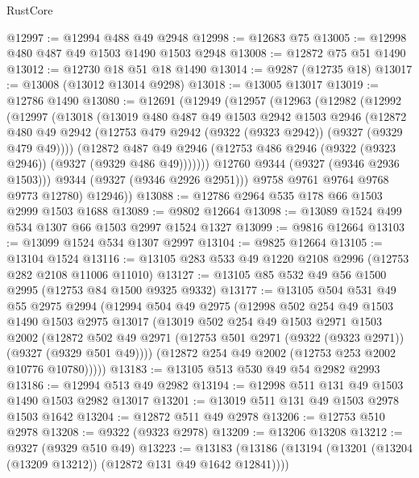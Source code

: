 \begin{lexlean}{RustCore}
\begin{coremodule}
@12997 := @12994 @488 @49 @2948
@12998 := @12683 @75
@13005 := @12998 @480 @487 @49 @1503 @1490 @1503 @2948
@13008 := @12872 @75 @51 @1490
@13012 := @12730 @18 @51 @18 @1490
@13014 := @9287 (@12735 @18)
@13017 := @13008 (@13012 @13014 @9298)
@13018 := @13005 @13017
@13019 := @12786 @1490
@13080 := @12691
    (@12949
      (@12957
        (@12963
          (@12982
            (@12992
              (@12997
                (@13018
                  (@13019
                    @480
                    @487
                    @49
                    @1503
                    @2942
                    @1503
                    @2946
                    (@12872
                      @480
                      @49
                      @2942
                      (@12753 @479 @2942 (@9322 (@9323 @2942)) (@9327 (@9329 @479 @49))))
                    (@12872
                      @487
                      @49
                      @2946
                      (@12753 @486 @2946 (@9322 (@9323 @2946)) (@9327 (@9329 @486 @49)))))))
              @12760
              @9344
              (@9327 (@9346 @2936 @1503)))
            @9344
            (@9327 (@9346 @2926 @2951)))
          @9758
          @9761
          @9764
          @9768
          @9773
          @12780)
        @12946))
@13088 := @12786 @2964 @535 @178 @66 @1503 @2999 @1503 @1688
@13089 := @9802 @12664
@13098 := @13089 @1524 @499 @534 @1307 @66 @1503 @2997 @1524 @1327
@13099 := @9816 @12664
@13103 := @13099 @1524 @534 @1307 @2997
@13104 := @9825 @12664
@13105 := @13104 @1524
@13116 := @13105 @283 @533 @49 @1220 @2108 @2996 (@12753 @282 @2108 @11006 @11010)
@13127 := @13105 @85 @532 @49 @56 @1500 @2995 (@12753 @84 @1500 @9325 @9332)
@13177 := @13105
    @504
    @531
    @49
    @55
    @2975
    @2994
    (@12994
      @504
      @49
      @2975
      (@12998
        @502
        @254
        @49
        @1503
        @1490
        @1503
        @2975
        @13017
        (@13019
          @502
          @254
          @49
          @1503
          @2971
          @1503
          @2002
          (@12872 @502 @49 @2971 (@12753 @501 @2971 (@9322 (@9323 @2971)) (@9327 (@9329 @501 @49))))
          (@12872 @254 @49 @2002 (@12753 @253 @2002 @10776 @10780)))))
@13183 := @13105 @513 @530 @49 @54 @2982 @2993
@13186 := @12994 @513 @49 @2982
@13194 := @12998 @511 @131 @49 @1503 @1490 @1503 @2982 @13017
@13201 := @13019 @511 @131 @49 @1503 @2978 @1503 @1642
@13204 := @12872 @511 @49 @2978
@13206 := @12753 @510 @2978
@13208 := @9322 (@9323 @2978)
@13209 := @13206 @13208
@13212 := @9327 (@9329 @510 @49)
@13223 := @13183 (@13186 (@13194 (@13201 (@13204 (@13209 @13212)) (@12872 @131 @49 @1642 @12841))))

\end{coremodule}
\end{lexlean}
